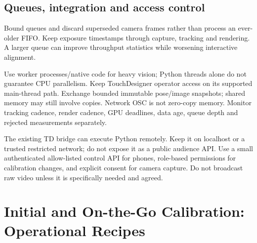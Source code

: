 \documentclass[11pt,a4paper]{article}
\begin{document}
\subsection{Queues, integration and access control}
Bound queues and discard superseded camera frames rather than process an
ever-older FIFO. Keep exposure timestamps through capture, tracking and
rendering. A larger queue can improve throughput statistics while worsening
interactive alignment.

Use worker processes/native code for heavy vision; Python threads alone do
not guarantee CPU parallelism. Keep TouchDesigner operator access on its
supported main-thread path. Exchange bounded immutable pose/image snapshots;
shared memory may still involve copies. Network OSC is not zero-copy memory.
Monitor tracking cadence, render cadence, GPU deadlines, data age, queue
depth and rejected measurements separately.

The existing TD bridge can execute Python remotely. Keep it on localhost or
a trusted restricted network; do not expose it as a public audience API.
Use a small authenticated allow-listed control API for phones, role-based
permissions for calibration changes, and explicit consent for camera capture.
Do not broadcast raw video unless it is specifically needed and agreed.

\section{Initial and On-the-Go Calibration: Operational Recipes}
\label{sec:recipes}
\end{document}
